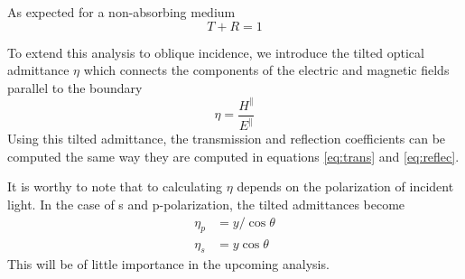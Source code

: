 \documentclass{article}
\begin{document}
    As expected for a non-absorbing medium $$ T + R = 1 $$

    To extend this analysis to oblique incidence, we introduce the tilted optical admittance $\eta$ which connects the components of the electric and magnetic fields parallel to the boundary
    \begin{equation}
        \eta = \frac{H^{\parallel}}{E^{\parallel}}
    \end{equation}
    Using this tilted admittance, the transmission and reflection coefficients can be computed the same way they are computed in equations \ref{eq:trans} and \ref{eq:reflec}.

    It is worthy to note that to calculating $\eta$ depends on the polarization of incident light. In the case of s and p-polarization, the tilted admittances become
    \begin{align}
        \eta_p &= y/\cos \theta \\
        \eta_s &= y \cos \theta
    \end{align}
    This will be of little importance in the upcoming analysis.
\end{document}
